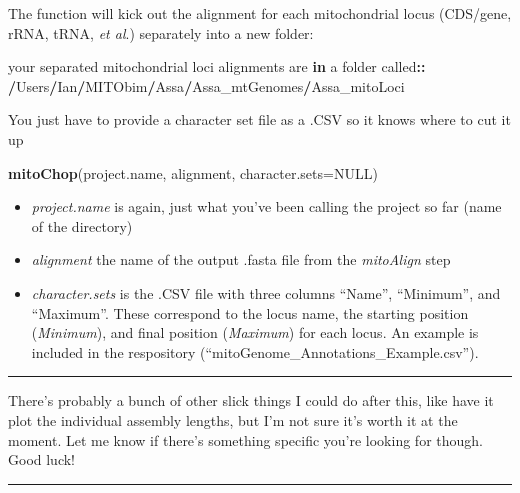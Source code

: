 \documentclass[
]{article}
\newenvironment{Shaded}{\begin{snugshade}}{\end{snugshade}}
\newcommand{\ControlFlowTok}[1]{\textcolor[rgb]{0.13,0.29,0.53}{\textbf{#1}}}
\newcommand{\DataTypeTok}[1]{\textcolor[rgb]{0.13,0.29,0.53}{#1}}
\newcommand{\ErrorTok}[1]{\textcolor[rgb]{0.64,0.00,0.00}{\textbf{#1}}}
\newcommand{\KeywordTok}[1]{\textcolor[rgb]{0.13,0.29,0.53}{\textbf{#1}}}
\newcommand{\NormalTok}[1]{#1}
\newcommand{\OperatorTok}[1]{\textcolor[rgb]{0.81,0.36,0.00}{\textbf{#1}}}
\newcommand{\OtherTok}[1]{\textcolor[rgb]{0.56,0.35,0.01}{#1}}
\newcommand{\StringTok}[1]{\textcolor[rgb]{0.31,0.60,0.02}{#1}}
\providecommand{\tightlist}{%
  \setlength{\itemsep}{0pt}\setlength{\parskip}{0pt}}
\begin{document}
The function will kick out the alignment for each mitochondrial locus
(CDS/gene, rRNA, tRNA, \emph{et al}.) separately into a new folder:

\begin{Shaded}
\begin{Highlighting}[]
\NormalTok{your separated mitochondrial loci alignments are }\ControlFlowTok{in}\NormalTok{ a folder called}\OperatorTok{::}
\StringTok{ }\ErrorTok{/}\NormalTok{Users}\OperatorTok{/}\NormalTok{Ian}\OperatorTok{/}\NormalTok{MITObim}\OperatorTok{/}\NormalTok{Assa}\OperatorTok{/}\NormalTok{Assa\_mtGenomes}\OperatorTok{/}\NormalTok{Assa\_mitoLoci}
\end{Highlighting}
\end{Shaded}

You just have to provide a character set file as a .CSV so it knows
where to cut it up

\begin{Shaded}
\begin{Highlighting}[]
\KeywordTok{mitoChop}\NormalTok{(project.name, alignment, }\DataTypeTok{character.sets=}\OtherTok{NULL}\NormalTok{)}
\end{Highlighting}
\end{Shaded}

\begin{itemize}
\tightlist
\item
  \emph{project.name} is again, just what you've been calling the
  project so far (name of the directory)\\
\item
  \emph{alignment} the name of the output .fasta file from the
  \emph{mitoAlign} step\\
\item
  \emph{character.sets} is the .CSV file with three columns ``Name'',
  ``Minimum'', and ``Maximum''. These correspond to the locus name, the
  starting position (\emph{Minimum}), and final position
  (\emph{Maximum}) for each locus. An example is included in the
  respository (``mitoGenome\_Annotations\_Example.csv'').
\end{itemize}

\begin{center}\rule{0.5\linewidth}{0.5pt}\end{center}

There's probably a bunch of other slick things I could do after this,
like have it plot the individual assembly lengths, but I'm not sure it's
worth it at the moment. Let me know if there's something specific you're
looking for though.\\
Good luck!

\begin{center}\rule{0.5\linewidth}{0.5pt}\end{center}
\end{document}
